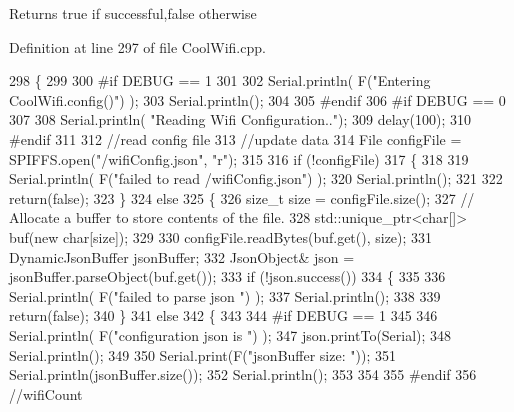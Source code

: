 \begin{DoxyReturn}{Returns}
true if successful,false otherwise 
\end{DoxyReturn}


Definition at line 297 of file Cool\+Wifi.\+cpp.


\begin{DoxyCode}
298 \{
299 
300 \textcolor{preprocessor}{#if DEBUG == 1 }
301 
302     Serial.println( F(\textcolor{stringliteral}{"Entering CoolWifi.config()"}) );
303     Serial.println();
304 
305 \textcolor{preprocessor}{#endif}
306 \textcolor{preprocessor}{#if DEBUG == 0}
307 
308     Serial.println( \textcolor{stringliteral}{"Reading Wifi Configuration.."});
309     delay(100);
310 \textcolor{preprocessor}{#endif }
311 
312     \textcolor{comment}{//read config file}
313     \textcolor{comment}{//update data}
314     File configFile = SPIFFS.open(\textcolor{stringliteral}{"/wifiConfig.json"}, \textcolor{stringliteral}{"r"});
315 
316     \textcolor{keywordflow}{if} (!configFile) 
317     \{
318     
319         Serial.println( F(\textcolor{stringliteral}{"failed to read /wifiConfig.json"}) );
320         Serial.println();
321 
322         \textcolor{keywordflow}{return}(\textcolor{keyword}{false});
323     \}
324     \textcolor{keywordflow}{else}
325     \{
326         \textcolor{keywordtype}{size\_t} size = configFile.size();
327         \textcolor{comment}{// Allocate a buffer to store contents of the file.}
328         std::unique\_ptr<char[]> buf(\textcolor{keyword}{new} \textcolor{keywordtype}{char}[size]);
329 
330         configFile.readBytes(buf.get(), size);
331         DynamicJsonBuffer jsonBuffer;
332         JsonObject& json = jsonBuffer.parseObject(buf.get());
333         \textcolor{keywordflow}{if} (!json.success()) 
334         \{
335 
336             Serial.println( F(\textcolor{stringliteral}{"failed to parse json "}) );
337             Serial.println();
338 
339             \textcolor{keywordflow}{return}(\textcolor{keyword}{false});
340         \} 
341         \textcolor{keywordflow}{else}
342         \{
343         
344 \textcolor{preprocessor}{        #if DEBUG == 1 }
345         
346             Serial.println( F(\textcolor{stringliteral}{"configuration json is "}) );
347             json.printTo(Serial);
348             Serial.println();
349 
350             Serial.print(F(\textcolor{stringliteral}{"jsonBuffer size: "}));
351             Serial.println(jsonBuffer.size());
352             Serial.println();
353 
354 
355 \textcolor{preprocessor}{        #endif}
356             \textcolor{comment}{//wifiCount}

\end{DoxyCode}
